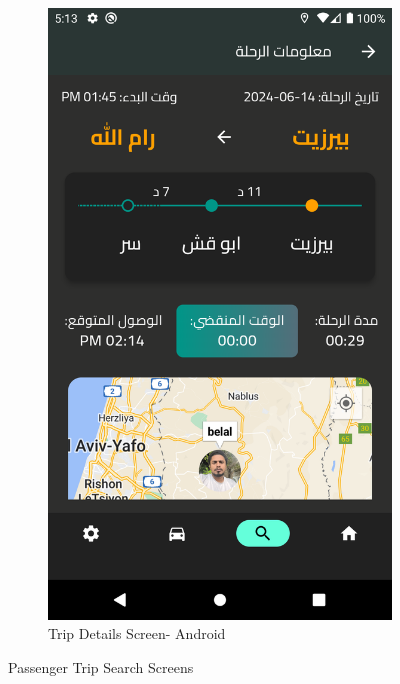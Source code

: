 \documentclass[a4paper, 12pt]{report} %
\begin{document}
\begin{figure}[H]
                \begin{subfigure}{0.31\textwidth}
                    \includegraphics[width=\linewidth]{Images/trip_Detail_screen.png}
                    \caption{Trip Details Screen- Android}
                    \label{fig:trip_details_1}
                \end{subfigure}
                \caption{Passenger Trip Search Screens}
                \label{fig:trip_search}
            \end{figure}
        \pagebreak
\end{document}
